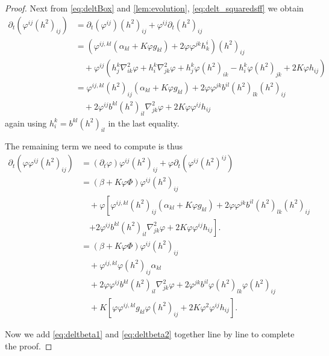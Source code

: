 \documentclass[12pt]{amsart}
\begin{document}
\begin{proof}
Next from \cref{eq:deltBox} and \cref{lem:evolution}, \cref{eq:delt_squaredsff} we obtain
\[
\begin{split}
\partial_{t} (\varphi^{ij}(h^2)_{ij}) &= \partial_{t}(\varphi^{ij}) (h^2)_{ij} + \varphi^{ij} \partial_t (h^2)_{ij} \\
&= \left(\varphi^{ij,kl} \left(\alpha_{kl} + K \varphi g_{kl}\right) + 2\varphi\varphi^{jk}h^{i}_{k}\right) (h^2)_{ij} \\
&\quad + \varphi^{ij} \left(h^k_j \nabla^2_{i
k} \varphi + h^k_i \nabla^2_{jk} \varphi + h^k_j \varphi(h^2)_{ik} - h^k_i \varphi(h^2)_{jk} + 2K\varphi h_{ij}\right) \\
&= \varphi^{ij,kl} (h^2)_{ij} \left(\alpha_{kl} + K \varphi g_{kl}\right) + 2\varphi\varphi^{jk} b^{il} (h^2)_{lk} (h^2)_{ij} \\
&\quad + 2 \varphi^{ij} b^{kl} (h^2)_{il} \nabla^2_{jk} \varphi  + 2K\varphi\varphi^{ij}h_{ij}
\end{split}
\]
again using \(h^k_i = b^{kl} (h^2)_{il}\) in the last equality.

The remaining term we need to compute is thus
\begin{equation}
\label{eq:deltbeta2}
\begin{split}
\partial_{t} (\varphi \varphi^{ij}(h^2)_{ij}) &= (\partial_{t} \varphi) \varphi^{ij}(h^2)_{ij} + \varphi \partial_t (\varphi^{ij} (h^2)^{ij}) \\
&= (\beta + K \varphi\Phi) \varphi^{ij}(h^2)_{ij} \\
&\quad + \varphi \left[\varphi^{ij,kl} (h^2)_{ij} \left(\alpha_{kl} + K \varphi g_{kl}\right) + 2\varphi\varphi^{jk} b^{il} (h^2)_{lk} (h^2)_{ij} \right.\\
&\quad \left. + 2 \varphi^{ij} b^{kl} (h^2)_{il} \nabla^2_{jk} \varphi  + 2K\varphi\varphi^{ij}h_{ij}\right]. \\
&= (\beta + K \varphi\Phi) \varphi^{ij}(h^2)_{ij} \\
&\quad + \varphi^{ij,kl} \varphi (h^2)_{ij} \alpha_{kl}  \\
&\quad + 2 \varphi\varphi^{ij} b^{kl} (h^2)_{il} \nabla^2_{jk} \varphi + 2\varphi^{jk} b^{il} \varphi (h^2)_{lk} \varphi (h^2)_{ij} \\
&\quad + K \left[\varphi \varphi^{ij,kl} g_{kl} \varphi (h^2)_{ij} + 2K\varphi^2\varphi^{ij}h_{ij}\right].
\end{split}
\end{equation}

Now we add \cref{eq:deltbeta1} and \cref{eq:deltbeta2} together line by line to complete the proof.
\end{proof}
\end{document}
